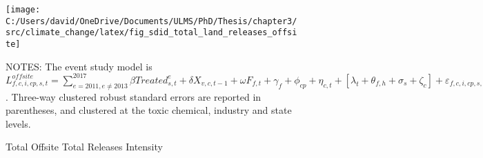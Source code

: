 \begin{figure}[H]
    \centering
    \texttt{[image: C:/Users/david/OneDrive/Documents/ULMS/PhD/Thesis/chapter3/src/climate\_change/latex/fig\_sdid\_total\_land\_releases\_offsite]}
    \caption{Total Offsite Total Releases Intensity}
    \label{fig:baseline-offsite-land-releases-intensity}
    \begin{minipage}{\columnwidth}
        \vspace{0.05in}
        \tiny NOTES: The event study model is $L_{f,c,i,cp,s,t}^{offsite} = \sum_{{e = 2011},{e \neq 2013}}^{2017} \beta Treated_{s,t}^e + \delta X_{v,c,t-1} + \omega F_{f,t} + \gamma_{f} + \phi_{cp} + \eta_{c,t} + \left[\lambda_{t} + \theta_{f,h} + \sigma_{s} + \zeta_{c} \right] + \varepsilon_{f,c,i,cp,s,t}$. Three-way clustered robust standard errors are reported in parentheses, and clustered at the toxic chemical, industry and state levels.
    \end{minipage}
\end{figure}